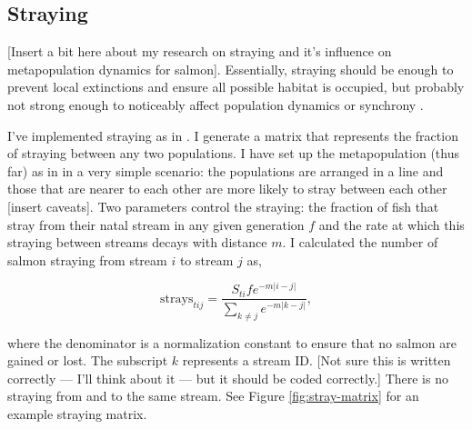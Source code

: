 \documentclass[12pt]{article}
\begin{document}
\subsection{Straying}

{[}Insert a bit here about my research on straying and it's influence on
metapopulation dynamics for salmon{]}. Essentially, straying should be
enough to prevent local extinctions and ensure all possible habitat is
occupied, but probably not strong enough to noticeably affect population
dynamics or synchrony \citep{Schtickzelle2007}.

I've implemented straying as in \citet{Cooper1999}. I generate a matrix
that represents the fraction of straying between any two populations. I
have set up the metapopulation (thus far) as in in a very simple
scenario: the populations are arranged in a line and those that are
nearer to each other are more likely to stray between each other
{[}insert caveats{]}. Two parameters control the straying: the fraction
of fish that stray from their natal stream in any given generation $f$
and the rate at which this straying between streams decays with distance
$m$. I calculated the number of salmon straying from stream $i$ to
stream $j$ as,

\begin{equation}
  \mathrm{strays}_{tij} = \frac{S_{ti} f e^{-m \lvert i-j \rvert }}{\sum\limits_{k \neq j}^{} e^{-m \lvert k-j \rvert }},
\end{equation}

where the denominator is a normalization constant to ensure that no
salmon are gained or lost. The subscript $k$ represents a stream ID.
{[}Not sure this is written correctly --- I'll think about it --- but it
should be coded correctly.{]} There is no straying from and to the same
stream. See Figure \ref{fig:stray-matrix} for an example straying
matrix.
\end{document}
